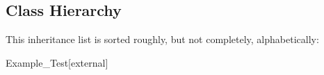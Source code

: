 \subsection{Class Hierarchy}
This inheritance list is sorted roughly, but not completely, alphabetically\+:\begin{DoxyCompactList}
\item Example\+\_\+\+Test{\ttfamily  \mbox{[}external\mbox{]}}\begin{DoxyCompactList}
\item {}
\end{DoxyCompactList}
\end{DoxyCompactList}

